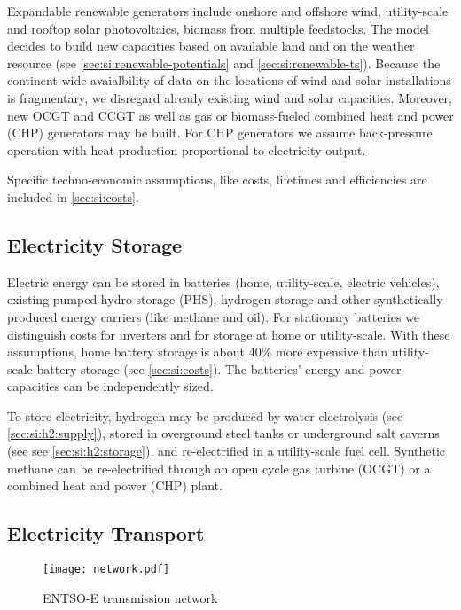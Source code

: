 Expandable renewable generators include onshore and offshore wind, utility-scale
and rooftop solar photovoltaics, biomass from multiple feedstocks. The model
decides to build new capacities based on available land and on the weather
resource (see \cref{sec:si:renewable-potentials} and
\cref{sec:si:renewable-ts}). Because the continent-wide avaialbility of data on
the locations of wind and solar installations is fragmentary, we disregard
already existing wind and solar capacities. Moreover, new OCGT and CCGT as well
as gas or biomass-fueled combined heat and power (CHP) generators may be built.
For CHP generators we assume back-pressure operation with heat production
proportional to electricity output.

Specific techno-economic assumptions, like costs, lifetimes and efficiencies are
included in \cref{sec:si:costs}.

\subsection{Electricity Storage}
\label{sec:si:electricity:storage}

Electric energy can be stored in batteries (home, utility-scale, electric
vehicles), existing pumped-hydro storage (PHS), hydrogen storage and other
synthetically produced energy carriers (like methane and oil). For stationary
batteries we distinguish costs for inverters and for storage at home or
utility-scale. With these assumptions, home battery storage is about 40\% more
expensive than utility-scale battery storage (see \cref{sec:si:costs}). The
batteries' energy and power capacities can be independently sized.

To store electricity, hydrogen may be produced by water electrolysis (see \cref{sec:si:h2:supply}),
stored in overground steel tanks or underground salt caverns (see see \cref{sec:si:h2:storage}), and
re-electrified in a utility-scale fuel cell. Synthetic methane can be
re-electrified through an open cycle gas turbine (OCGT) or a combined heat and
power (CHP) plant.

\subsection{Electricity Transport}
\label{sec:si:electricity:transport}

\begin{figure}
    \texttt{[image: network.pdf]}
    \label{fig:base-network}
    \caption{ENTSO-E transmission network}
\end{figure}

